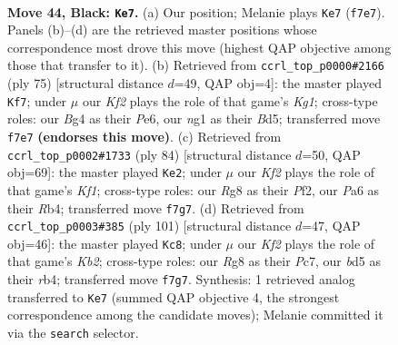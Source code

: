 \documentclass[11pt]{article}
\begin{document}
\clearpage

\begin{figure}[p]\centering
\begin{subfigure}{0.46\textwidth}\centering
\resizebox{\linewidth}{!}{%
\newchessgame
\chessboard[
  setfen={6r1/r4k2/p2R4/B2B2p1/5pb1/PP6/1K5P/R5N1 b - - 2 44},
  showmover=false,
  pgfstyle=straightmove, color=movearrow, markmove={f7-e7}
]}
\caption{}
\end{subfigure}\hfill
\begin{subfigure}{0.46\textwidth}\centering
\resizebox{\linewidth}{!}{%
\newchessgame
\chessboard[
  setfen={3r2k1/p3r3/4p2p/1R1b4/1P3P2/R2BK3/7P/8 b - - 2 38},
  showmover=false,
  pgfstyle=straightmove, color=movearrow, markmove={g8-f7}
]}
\caption{}
\end{subfigure}
\\[4pt]
\begin{subfigure}{0.46\textwidth}\centering
\resizebox{\linewidth}{!}{%
\newchessgame
\chessboard[
  setfen={7r/p4pk1/P5p1/1P4r1/1RBR4/7b/5P2/5K2 w - - 2 43},
  showmover=false,
  pgfstyle=straightmove, color=movearrow, markmove={f1-e2}
]}
\caption{}
\end{subfigure}\hfill
\begin{subfigure}{0.46\textwidth}\centering
\resizebox{\linewidth}{!}{%
\newchessgame
\chessboard[
  setfen={8/1kp4p/p4bp1/2r5/1R3B2/1P6/P4PKP/8 b - - 5 51},
  showmover=false,
  pgfstyle=straightmove, color=movearrow, markmove={b7-c8}
]}
\caption{}
\end{subfigure}
\caption{\textbf{Move 44, Black: \texttt{Ke7}.} (a) Our position; Melanie plays \texttt{Ke7} (\texttt{f7e7}). Panels (b)--(d) are the retrieved master positions whose correspondence most drove this move (highest QAP objective among those that transfer to it). (b) Retrieved from \texttt{ccrl\_top\_p0000\#2166} (ply 75) [structural distance $d$=49, QAP obj=4]: the master played \texttt{Kf7}; under $\mu$ our \emph{Kf2} plays the role of that game's \emph{Kg1}; cross-type roles: our \emph{B}g4 as their \emph{P}e6, our \emph{n}g1 as their \emph{B}d5; transferred move \texttt{f7e7} \textbf{(endorses this move)}. (c) Retrieved from \texttt{ccrl\_top\_p0002\#1733} (ply 84) [structural distance $d$=50, QAP obj=69]: the master played \texttt{Ke2}; under $\mu$ our \emph{Kf2} plays the role of that game's \emph{Kf1}; cross-type roles: our \emph{R}g8 as their \emph{P}f2, our \emph{P}a6 as their \emph{R}b4; transferred move \texttt{f7g7}. (d) Retrieved from \texttt{ccrl\_top\_p0003\#385} (ply 101) [structural distance $d$=47, QAP obj=46]: the master played \texttt{Kc8}; under $\mu$ our \emph{Kf2} plays the role of that game's \emph{Kb2}; cross-type roles: our \emph{R}g8 as their \emph{P}c7, our \emph{b}d5 as their \emph{r}b4; transferred move \texttt{f7g7}. Synthesis: 1 retrieved analog transferred to \texttt{Ke7} (summed QAP objective 4, the strongest correspondence among the candidate moves); Melanie committed it via the \texttt{search} selector.}
\label{fig:thought-m87}
\end{figure}
\end{document}
